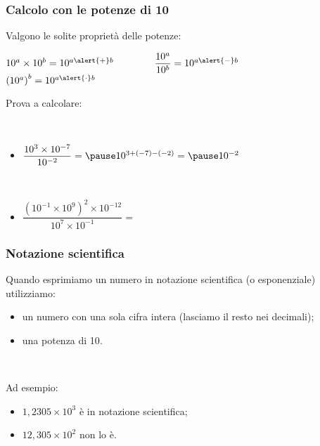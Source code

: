 \documentclass[]{beamer}
\begin{document}
\begin{frame}
\frametitle{Calcolo con le potenze di 10}
Valgono le solite proprietà delle potenze:
  \begin{center}
  \colorbox{blue!30}{$10^{a} \times 10^b = 10^{a\alert{+}b}$}~~~~~~~~\colorbox{blue!30}{$\dfrac{10^{a}}{10^b} = 10^{a\alert{-}b}$}~~~~~~~~\colorbox{blue!30}{$\left( 10^a \right)^b = 10^{a\alert{\cdot}b}$}
  \end{center}\pause
  Prova a calcolare:
  
  ~
  
  \begin{itemize}
    \item $ \dfrac{10^3 \times 10^{-7}}{10^{-2}} = \pause 10^{3+(-7) - (-2)} =\pause  10^{-2} $\pause
    
    ~
    
    \item $ \dfrac{\left( 10^{-1} \times 10^{9} \right)^2 \times 10^{-12}}{10^7 \times 10^{-1}} = $
  \end{itemize}
\end{frame}



\begin{frame}
\frametitle{Notazione scientifica}
Quando esprimiamo un numero in notazione scientifica (o esponenziale) utilizziamo:
\begin{itemize}
  \item un numero con \alert{una sola cifra intera} (lasciamo il resto nei decimali);\pause
  \item \alert{una potenza di 10}.
\end{itemize}\pause

~

Ad esempio:
\begin{itemize}
  \item $ 1,2305 \times 10^3 $ è in notazione scientifica;
  \item $ 12,305 \times 10^2 $ non lo è.
\end{itemize}
\end{frame}
\end{document}
